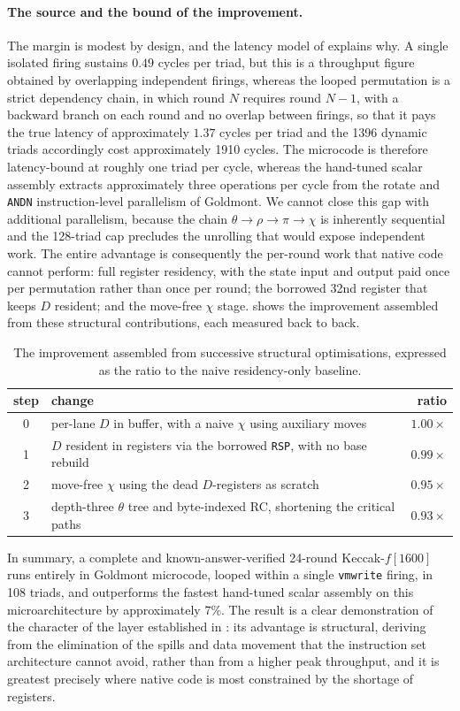 \paragraph{The source and the bound of the improvement.}
The margin is modest by design, and the latency model of 
explains why. A single isolated firing sustains $0.49$ cycles per triad, but
this is a throughput figure obtained by overlapping independent firings, whereas
the looped permutation is a strict dependency chain, in which round $N$ requires
round $N{-}1$, with a backward branch on each round and no overlap between
firings, so that it pays the true latency of approximately $1.37$ cycles per
triad and the 1396 dynamic triads accordingly cost approximately 1910 cycles.
The microcode is therefore latency-bound at roughly one triad per cycle, whereas
the hand-tuned scalar assembly extracts approximately three operations per cycle
from the rotate and \texttt{ANDN} instruction-level parallelism of Goldmont. We
cannot close this gap with additional parallelism, because the chain
$\theta{\to}\rho{\to}\pi{\to}\chi$ is inherently sequential and the 128-triad
cap precludes the unrolling that would expose independent work. The entire
advantage is consequently the per-round work that native code cannot perform:
full register residency, with the state input and output paid once per
permutation rather than once per round; the borrowed 32nd register that keeps
$D$ resident; and the move-free $\chi$ stage.  shows the
improvement assembled from these structural contributions, each measured back to
back.

\begin{table}[t]
\centering
\caption{The improvement assembled from successive structural optimisations,
expressed as the ratio to the naive residency-only baseline.}
\label{tab:keccak-opt}
\small
\begin{tabular}{@{}clr@{}}
\toprule
step & change & ratio \\
\midrule
0 & per-lane $D$ in buffer, with a naive $\chi$ using auxiliary moves & $1.00\times$ \\
1 & $D$ resident in registers via the borrowed \texttt{RSP}, with no base rebuild & $0.99\times$ \\
2 & move-free $\chi$ using the dead $D$-registers as scratch & $0.95\times$ \\
3 & depth-three $\theta$ tree and byte-indexed RC, shortening the critical paths & $0.93\times$ \\
\bottomrule
\end{tabular}
\end{table}

In summary, a complete and known-answer-verified 24-round Keccak-$f[1600]$ runs
entirely in Goldmont microcode, looped within a single \texttt{vmwrite} firing,
in 108 triads, and outperforms the fastest hand-tuned scalar assembly on this
microarchitecture by approximately $7\%$. The result is a clear demonstration of
the character of the layer established in : its advantage
is structural, deriving from the elimination of the spills and data movement
that the instruction set architecture cannot avoid, rather than from a higher
peak throughput, and it is greatest precisely where native code is most
constrained by the shortage of registers.
